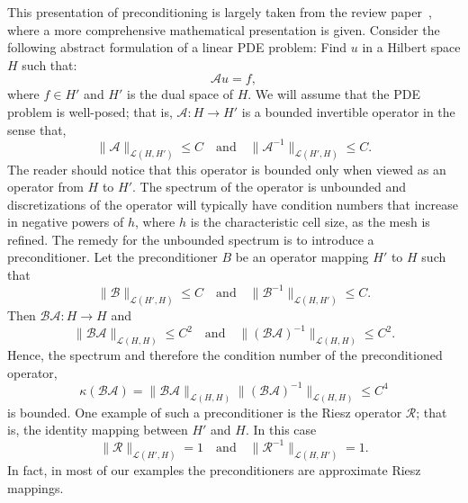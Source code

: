 This presentation of preconditioning is largely taken from the
review paper~\citep{MardalWinther11}, where a more comprehensive mathematical
presentation is given. Consider the following abstract formulation
of a linear PDE problem:  
Find $u$ in a Hilbert space $H$ such that: 
\begin{equation}
\mathcal{A} u = f,  
\end{equation}
where $f\in H'$ and $H'$ is the dual space of $H$.  
We will assume that the PDE problem is well-posed; that is,  
$\mathcal{A} : H \rightarrow H'$ is a bounded invertible operator in the sense that,  
\begin{equation}
\|\mathcal{A}\|_{\mathcal{L} (H, H')} \le C \quad \mbox{and} \quad  
\|\mathcal{A}^{-1}\|_{\mathcal{L} (H', H)} \le C. 
\end{equation}
The reader should notice that this operator is bounded only when 
viewed as an operator from $H$ to $H'$. 
The spectrum of the operator is unbounded and   
discretizations of the operator will typically have  
condition numbers that increase 
in negative powers of $h$, where $h$ is the
characteristic cell size, as the mesh is refined. 
The remedy for the unbounded spectrum is to introduce a preconditioner. 
Let the preconditioner $B$ be an operator
mapping $H'$ to $H$ such that  
\begin{equation}
\|\mathcal{B}\|_{\mathcal{L}(H', H)} \le C \quad \mbox{and} \quad   
\|\mathcal{B}^{-1}\|_{\mathcal{L}(H, H')} \le C. 
\end{equation}
Then 
$\mathcal{B}\mathcal{A}: H \rightarrow H$ and 
\begin{equation}
\|\mathcal{B}\mathcal{A}\|_{\mathcal{L}(H, H)} \le C^2 \quad \mbox{and} \quad  
\|(\mathcal{B}\mathcal{A})^{-1}\|_{\mathcal{L}(H, H)} \le C^2. 
\end{equation}
Hence, the spectrum and therefore the condition number of the
preconditioned operator, 
\begin{equation}
\kappa(\mathcal{B}\mathcal{A}) = \|\mathcal{B}\mathcal{A}\|_{\mathcal{L}(H, H)} \|(\mathcal{B}\mathcal{A})^{-1}\|_{\mathcal{L}(H, H)} \le C^4  
\end{equation}
is bounded.  One example of such a preconditioner is the Riesz operator
$\mathcal{R}$; that is, the identity mapping between $H'$ and $H$.  
In this case 
\begin{equation}
\|\mathcal{R}\|_{\mathcal{L}(H', H)} = 1 \quad \mbox{and} \quad   
\|\mathcal{R}^{-1}\|_{\mathcal{L}(H, H')} = 1. 
\end{equation}
In fact, in most of our examples the preconditioners are approximate Riesz mappings.  

